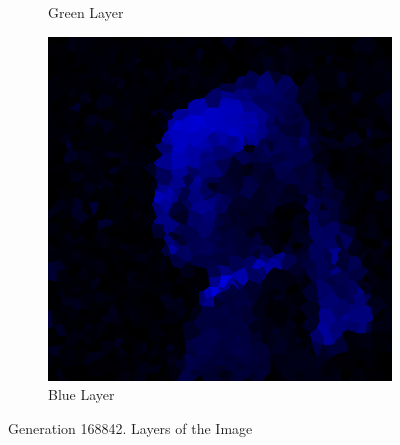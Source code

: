 \documentclass{article}
\begin{document}
\begin{figure}[ht]
\begin{subfigure}[b]{0.3\textwidth}
         \caption{Green Layer}
     \end{subfigure}
     \hfill
     \begin{subfigure}[b]{0.3\textwidth}
         \centering
         \includegraphics[width=\textwidth]{latex_src/b.png}
         \caption{Blue Layer}
     \end{subfigure}
     \caption{Generation 168842. Layers of the Image}
\end{figure}
\end{document}
